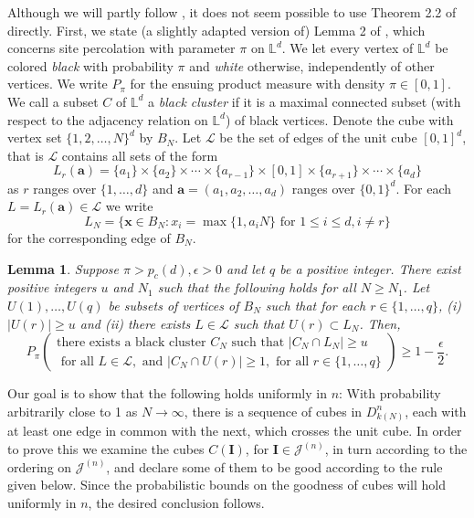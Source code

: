\documentclass[11pt,a4paper]{article}
\newcommand{\Ib}{\ensuremath{\mathbf{I}}}
\newcommand{\IL}{\ensuremath{\mathbb{L}}}
\newcommand{\pc}{\ensuremath{p_{c}(d)}}
\newcommand{\JJ}{\ensuremath{\mathcal{J}}}
\newcommand{\LL}{\ensuremath{\mathcal{L}}}
\newtheorem{lemma}[theorem]{Lemma}
\theoremstyle{remark}
\begin{document}
Although we will partly follow \cite{FalGri}, it does not seem possible to use Theorem 2.2 of \cite{FalGri} directly. 
First, we state (a slightly adapted version of) Lemma 2 of \cite{FalGri}, which concerns site percolation with parameter $\pi$ on $\IL^d$. We let every vertex of $\IL^d$ be colored \emph{black} with probability $\pi$ and \emph{white} otherwise, independently of other vertices. We write $P_\pi$ for the ensuing product measure with density $\pi \in [0,1]$. We call a subset $C$ of $\IL^{d}$ a \emph{black cluster} if it is a maximal connected subset (with respect to the adjacency relation on $\IL^d$) of black vertices. Denote the cube with vertex set  $\{1,2,\ldots,N\}^d$ by $B_N$. Let $\LL$ be the set of edges of the unit cube $[0,1]^d$, that is $\LL$ contains all sets of the form
\[
 L_{r}(\mathbf{a})=\{a_1\} \times \{a_2\} \times \cdots \times \{a_{r-1}\} \times [0,1] \times \{a_{r+1}\} \times \cdots \times \{a_d\}
\]
as $r$ ranges over $\{1,\ldots,d\}$ and $\mathbf{a} = (a_1,a_2,\ldots,a_d)$ ranges over $\{0,1\}^d$. For each $L=L_{r}(\mathbf{a}) \in \LL$ we write 
\[
L_N=\{ \mathbf{x} \in B_N: x_{i} = \max\{1,a_{i}N\} \text{ for } 1 \leq i \leq d, i \neq r \}
\]
for the corresponding edge of $B_N$.


\begin{lemma}\label{lem FalGri}
 Suppose $\pi>\pc, \epsilon>0$ and let $q$ be a positive integer. There exist positive integers $u$ and $N_1$ such that the following holds for all $N \geq N_1$. Let $U(1),\ldots,U(q)$ be subsets of vertices of $B_N$ such that for each $r\in\{1,\ldots,q\}$, (i) $|U(r)| \geq u$ and (ii) there exists $L \in \LL$ such that $U(r) \subset L_N$. Then, 
\begin{equation}\label{perc bound}
 P_{\pi}\left(\begin{array}{c}
      \text{there exists a black cluster } C_N \text{ such that }|C_N \cap L_N| \geq u \\
      \text{ for all } L \in \LL, \text{ and } | C_N \cap U(r)| \geq 1, \text{ for all } r\in\{1,\ldots,q\} \end{array}\right) \geq 1- \frac{\epsilon}{2}.
\end{equation}
\end{lemma}


Our goal is to show that the following holds uniformly in $n$: With probability arbitrarily close to 1 as $N \to \infty$, there is a sequence of cubes in $D_{k(N)}^n$, each with at least one edge in common with the next, which crosses the unit cube. In order to prove this we examine the cubes $C(\Ib)$, for $\Ib\in\JJ^{(n)}$, in turn according to the ordering on $\JJ^{(n)}$, and declare some of them to be good according to the rule given below. Since the probabilistic bounds on the goodness of cubes will hold uniformly in $n$, the desired conclusion follows. 
\end{document}
